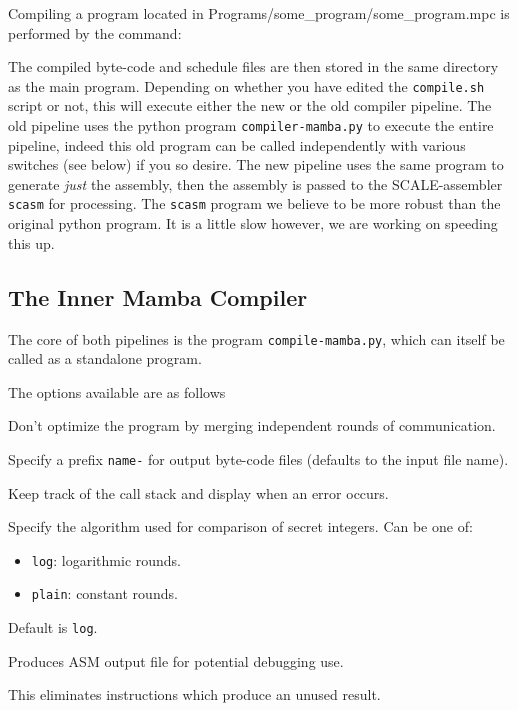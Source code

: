 Compiling a program located in Programs/some\_program/some\_program.mpc is performed by the
command:


\noindent The compiled byte-code and schedule files are then stored in the
same directory as the main program.
Depending on whether you have edited the \verb+compile.sh+ script or
not, this will execute either the new or the old compiler pipeline.
The old pipeline uses the python program \verb+compiler-mamba.py+ to
execute the entire pipeline, indeed this old program can be called independently
with various switches (see below) if you so desire.
The new pipeline uses the same program to generate {\em just} the
assembly, then the assembly is passed to the SCALE-assembler \verb+scasm+ for
processing. The \verb+scasm+ program we believe to be more robust than the
original python program. It is a little slow however, we are working on
speeding this up.

\subsection{The Inner Mamba Compiler}
The core of both pipelines is the program \verb+compile-mamba.py+,
which can itself be called as a standalone program.


\noindent
The options available are as follows

Don't optimize the program by merging independent rounds of communication.

Specify a prefix \verb|name-| for output byte-code files (defaults to the input file name).

Keep track of the call stack and display when an error occurs.

Specify the algorithm used for comparison of secret integers. Can be one of:
\begin{itemize}
\item \verb|log|: logarithmic rounds.
\item \verb|plain|: constant rounds.
\end{itemize}
Default is \verb|log|.

Produces ASM output file for potential debugging use.

This eliminates instructions which produce an unused result.

